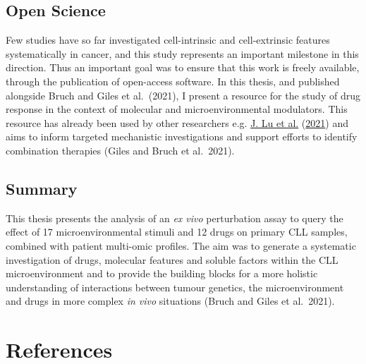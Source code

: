 \documentclass[11pt, a4paper, twosided]{book}
\begin{document}
\hypertarget{open-science}{%
\section{Open Science}\label{open-science}}

Few studies have so far investigated cell-intrinsic and cell-extrinsic features systematically in cancer, and this study represents an important milestone in this direction. Thus an important goal was to ensure that this work is freely available, through the publication of open-access software. In this thesis, and published alongside Bruch and Giles et al.~(2021), I present a resource for the study of drug response in the context of molecular and microenvironmental modulators. This resource has already been used by other researchers e.g. \protect\hyperlink{ref-Lu2021}{J. Lu et al.} (\protect\hyperlink{ref-Lu2021}{2021}) and aims to inform targeted mechanistic investigations and support efforts to identify combination therapies (Giles and Bruch et al.~2021).

\hypertarget{summary-3}{%
\section{Summary}\label{summary-3}}

This thesis presents the analysis of an \emph{ex vivo} perturbation assay to query the effect of 17 microenvironmental stimuli and 12 drugs on primary CLL samples, combined with patient multi-omic profiles. The aim was to generate a systematic investigation of drugs, molecular features and soluble factors within the CLL microenvironment and to provide the building blocks for a more holistic understanding of interactions between tumour genetics, the microenvironment and drugs in more complex \emph{in vivo} situations (Bruch and Giles et al.~2021).

\newpage

\hypertarget{references}{%
\chapter*{References}\label{references}}

\noindent

\setlength{\parindent}{-0.5cm}
\setlength{\leftskip}{0.5cm}
\setlength{\parskip}{8pt}
\end{document}

